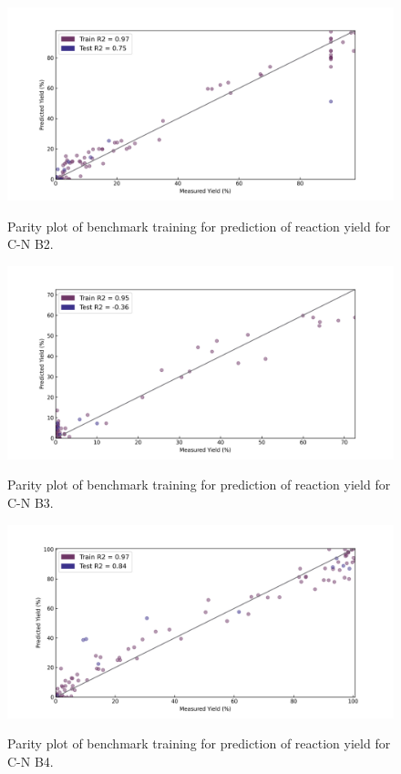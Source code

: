 \begin{figure}
\caption{ Parity plot of benchmark training for prediction of reaction yield for C-N B2.}\includegraphics[width=1\textwidth]{gfx/Appendix/baumgartner_cn_case_2_parity_plot.png}
\label{fig:2}
\end{figure}

\begin{figure}
\caption{Parity plot of benchmark training for prediction of reaction yield for C-N B3.}\includegraphics[width=1\textwidth]{gfx/Appendix/baumgartner_cn_case_3_parity_plot.png}
\label{fig:3}
\end{figure}

\begin{figure}
\caption{Parity plot of benchmark training for prediction of reaction yield for C-N B4.}\includegraphics[width=1\textwidth]{gfx/Appendix/baumgartner_cn_case_4_parity_plot.png}
\label{fig:4}
\end{figure}

